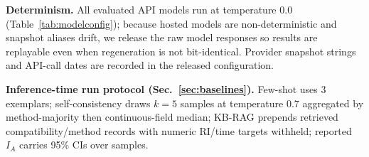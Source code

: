 \documentclass[conference]{IEEEtran}
\begin{document}
\noindent\textbf{Determinism.} All evaluated API models run at temperature
$0.0$ (Table~\ref{tab:modelconfig}); because hosted models are non-deterministic
and snapshot aliases drift, we release the raw model responses so results are
replayable even when regeneration is not bit-identical. Provider snapshot
strings and API-call dates are recorded in the released configuration.

\noindent\textbf{Inference-time run protocol (Sec.~\ref{sec:baselines}).}
Few-shot uses 3 exemplars; self-consistency draws $k{=}5$ samples at temperature
$0.7$ aggregated by method-majority then continuous-field median; KB-RAG
prepends retrieved compatibility/method records with numeric RI/time targets
withheld; reported $I_A$ carries 95\% CIs over samples.



\end{document}
